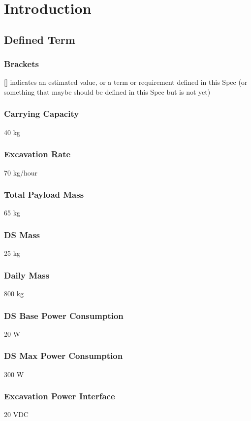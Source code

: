 \newpage
\section{Introduction}
\subsection{Defined Term}
\subsubsection{Brackets}
\label{term:Brackets}
[] indicates an estimated value, or a term or requirement defined in this Spec (or something that maybe should be defined in this Spec but is not yet)
\subsubsection{Carrying Capacity}
\label{term:Carrying Capacity}
40 kg
\subsubsection{Excavation Rate}
\label{term:Excavation Rate}
70 kg/hour
\subsubsection{Total Payload Mass}
\label{term:Total Payload Mass}
65 kg
\subsubsection{DS Mass}
\label{term:DS Mass}
25 kg
\subsubsection{Daily Mass}
\label{term:Daily Mass}
800 kg
\subsubsection{DS Base Power Consumption}
\label{term:DS Base Power Consumption}
20 W
\subsubsection{DS Max Power Consumption}
\label{term:DS Max Power Consumption}
300 W
\subsubsection{Excavation Power Interface}
\label{term:Excavation Power Interface}
20 VDC
